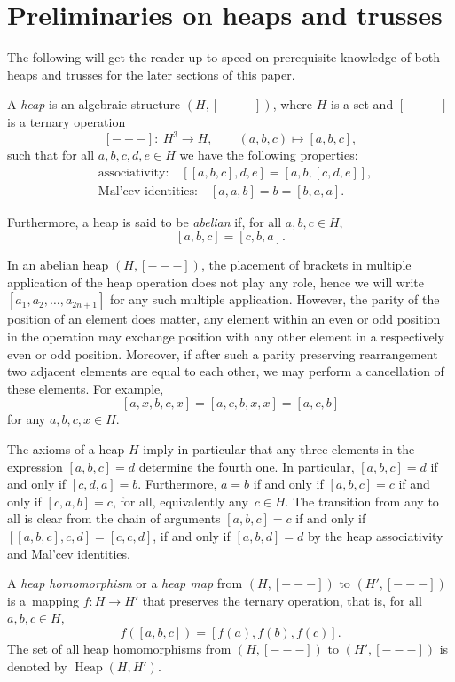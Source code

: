 \documentclass[pdftex]{sigma}
\numberwithin{equation}{section}
\newcommand{\heap}{\operatorname{Heap}}
\begin{document}
\section{Preliminaries on heaps and trusses}
The following will get the reader up to speed on prerequisite knowledge of both heaps \cite{5, Brz:par, 2, 6} and trusses \cite{3, Brz:par} for the later sections of this paper.
\begin{Definition}\label{heap}
A \textit{heap} is an algebraic structure $(H, [---])$, where $H$ is a set and $[---]$ is a ternary operation
\[[---]\colon \ H^{3} \rightarrow H, \qquad (a,b,c) \mapsto [a,b,c],\]
such that for all $a,b,c,d,e \in H$ we have the following properties:
\begin{align*}
& \text{associativity:} \quad [[a,b,c],d,e] = [a,b,[c,d,e]],\\
& \text{Mal'cev identities:} \quad [a,a,b] = b = [b,a,a].
\end{align*}

Furthermore, a heap is said to be \textit{abelian} if, for all $a,b,c \in H$,
\[[a,b,c]=[c,b,a].\]
\end{Definition}
\begin{Remark}\label{rem.rules}
In an abelian heap $(H,[---])$, the placement of brackets in multiple application of the heap operation does not play any role, hence we will write $[a_1,a_2,\dots ,a_{2n+1}]$ for any such multiple application. However, the parity of the position of an element does matter, any element within an even or odd position in the operation may exchange position with any other element in a respectively even or odd position. Moreover, if after such a parity preserving rearrangement two adjacent elements are equal to each other, we may perform a cancellation of these elements. For example,
\[[a,x,b,c,x] = [a,c,b,x,x] = [a,c,b] \]
for any $a,b,c,x \in H$.
\end{Remark}
\begin{Remark}\label{rem.equal}
The axioms of a heap $H$ imply in particular that any three elements in the expression $[a,b,c]=d$ determine the fourth one. In particular, $[a,b,c]=d$ if and only if ${[c,d,a]=b}$. Furthermore, $a=b$ if and only if $[a,b,c]=c$ if and only if $[c,a,b]= c$, for all, equivalently any~$c\in H$. The transition from any to all is clear from the chain of arguments $[a,b,c]=c$ if and only if $[[a,b,c],c,d]=[c,c,d]$, if and only if $[a,b,d]=d$ by the heap associativity and Mal'cev identities.
\end{Remark}
\begin{Definition}
A \textit{heap homomorphism} or a \textit{heap map} from $(H,[---])$ to $(H',[---])$ is a~mapping $f\colon H \rightarrow H'$ that preserves the ternary operation, that is, for all $a,b,c \in H$, \[f([a,b,c])=[f(a),f(b),f(c)].\]
The set of all heap homomorphisms from $(H,[---])$ to $(H',[---])$ is denoted by $\heap(H,H')$.
\end{Definition}
\end{document}
